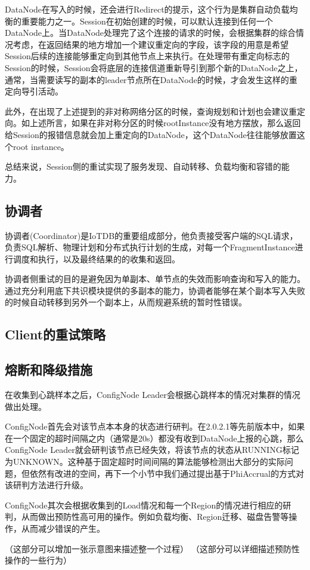 DataNode在写入的时候，还会进行Redirect的提示，这个行为是集群自动负载均衡的重要能力之一。Session在初始创建的时候，可以默认连接到任何一个DataNode上。当DataNode处理完了这个连接的请求的时候，会根据集群的综合情况考虑，在返回结果的地方增加一个建议重定向的字段，该字段的用意是希望Session后续的连接能够重定向到其他节点上来执行。在处理带有重定向标志的Session的时候，Session会将底层的连接信道重新导引到那个新的DataNode之上，通常，当需要读写的副本的leader节点所在DataNode的时候，才会发生这样的重定向导引活动。

此外，在出现了上述提到的非对称网络分区的时候，查询规划和计划也会建议重定向。如上述所言，如果在非对称分区的时候rootInstance没有地方摆放，那么返回给Session的报错信息就会加上重定向的DataNode，这个DataNode往往能够放置这个root instance。


总结来说，Session侧的重试实现了服务发现、自动转移、负载均衡和容错的能力。



\subsection{协调者}

协调者(Coordinator)是IoTDB的重要组成部分，他负责接受客户端的SQL请求，负责SQL解析、物理计划和分布式执行计划的生成，对每一个FragmentInstance进行调度和执行，以及最终结果的的收集和返回。

协调者侧重试的目的是避免因为单副本、单节点的失效而影响查询和写入的能力。通过充分利用底下共识模块提供的多副本的能力，协调者能够在某个副本写入失败的时候自动转移到另外一个副本上，从而规避系统的暂时性错误。






\subsection{Client的重试策略}






\subsection{熔断和降级措施}




在收集到心跳样本之后，ConfigNode Leader会根据心跳样本的情况对集群的情况做出处理。

ConfigNode首先会对该节点本本身的状态进行研判。在2.0.2.1等先前版本中，如果在一个固定的超时间隔之内（通常是20s）都没有收到DataNode上报的心跳，那么ConfigNode Leader就会研判该节点已经失效，将该节点的状态从RUNNING标记为UNKNOWN。这种基于固定超时时间间隔的算法能够检测出大部分的实际问题，但依然有改进的空间，再下一个小节中我们通过提出基于PhiAccrual的方式对该研判方法进行升级。

ConfigNode其次会根据收集到的Load情况和每一个Region的情况进行相应的研判，从而做出预防性高可用的操作。例如负载均衡、Region迁移、磁盘告警等操作，从而减少错误的产生。


（这部分可以增加一张示意图来描述整一个过程）
（这部分可以详细描述预防性操作的一些行为）